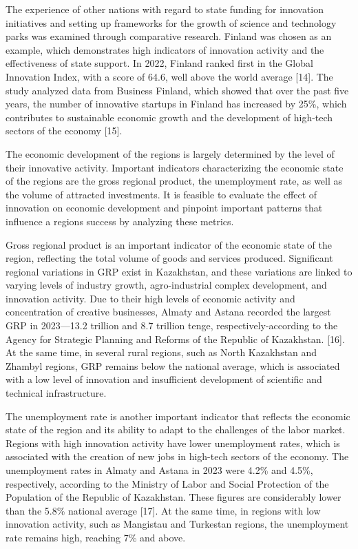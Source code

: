 The experience of other nations with regard to state funding for
innovation initiatives and setting up frameworks for the growth of
science and technology parks was examined through comparative research.
Finland was chosen as an example, which demonstrates high indicators of
innovation activity and the effectiveness of state support. In 2022,
Finland ranked first in the Global Innovation Index, with a score of
64.6, well above the world average {[}14{]}. The study analyzed data
from Business Finland, which showed that over the past five years, the
number of innovative startups in Finland has increased by 25\%, which
contributes to sustainable economic growth and the development of
high-tech sectors of the economy {[}15{]}.

The economic development of the regions is largely determined by the
level of their innovative activity. Important indicators characterizing
the economic state of the regions are the gross regional product, the
unemployment rate, as well as the volume of attracted investments. It is
feasible to evaluate the effect of innovation on economic development
and pinpoint important patterns that influence a
region\textquotesingle s success by analyzing these metrics.

Gross regional product is an important indicator of the economic state
of the region, reflecting the total volume of goods and services
produced. Significant regional variations in GRP exist in Kazakhstan,
and these variations are linked to varying levels of industry growth,
agro-industrial complex development, and innovation activity. Due to
their high levels of economic activity and concentration of creative
businesses, Almaty and Astana recorded the largest GRP in 2023---13.2
trillion and 8.7 trillion tenge, respectively-according to the Agency
for Strategic Planning and Reforms of the Republic of Kazakhstan.
{[}16{]}. At the same time, in several rural regions, such as North
Kazakhstan and Zhambyl regions, GRP remains below the national average,
which is associated with a low level of innovation and insufficient
development of scientific and technical infrastructure.

The unemployment rate is another important indicator that reflects the
economic state of the region and its ability to adapt to the challenges
of the labor market. Regions with high innovation activity have lower
unemployment rates, which is associated with the creation of new jobs in
high-tech sectors of the economy. The unemployment rates in Almaty and
Astana in 2023 were 4.2\% and 4.5\%, respectively, according to the
Ministry of Labor and Social Protection of the Population of the
Republic of Kazakhstan. These figures are considerably lower than the
5.8\% national average {[}17{]}. At the same time, in regions with low
innovation activity, such as Mangistau and Turkestan regions, the
unemployment rate remains high, reaching 7\% and above.

